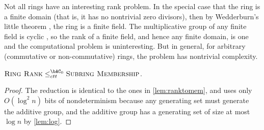 \documentclass{article}
\begin{document}
Not all rings have an interesting rank problem.
In the special case that the ring is a finite domain (that is, it has no nontrivial zero divisors), then by Wedderburn's little theorem \autocite[Theorem~3~§~11.1]{nicholson12}, the ring is a finite field.
The multiplicative group of any finite field is cyclic \autocite[Theorem~7~§~6.4]{nicholson12}, so the rank of a finite field, and hence any finite domain, is one and the computational problem is uninteresting.
But in general, for arbitrary (commutative or non-commutative) rings, the problem has nontrivial complexity.

\begin{lemma}\label{lem:ringranktomem}
  $\textsc{Ring Rank} \leq_{ctt}^{\bAC_0} \textsc{Subring Membership}$.
\end{lemma}
\begin{proof}
  The reduction is identical to the ones in \autoref{lem:ranktomem}, and uses only $O(\log^2 n)$ bits of nondeterminism because any generating set must generate the additive group, and the additive group has a generating set of size at most $\log n$ by \autoref{lem:log}.
\end{proof}
\end{document}
